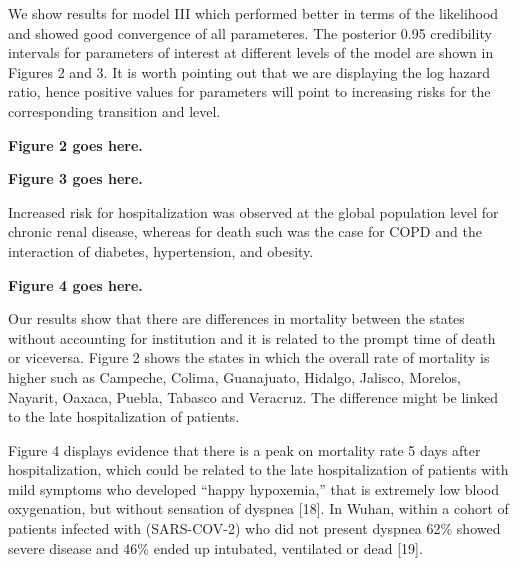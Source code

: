 \documentclass[10pt,letterpaper]{article}
\begin{document}
We show results for model III which performed better in terms of the
likelihood and showed good convergence of all parameteres. The posterior
0.95 credibility intervals for parameters of interest at different
levels of the model are shown in Figures 2 and 3. It is worth pointing
out that we are displaying the log hazard ratio, hence positive values
for parameters will point to increasing risks for the corresponding
transition and level.

\vspace{5mm}

\begin{center}
\textbf{Figure 2 goes here.}
\end{center}

\vspace{5mm}

\begin{center}
\textbf{Figure 3 goes here.}
\end{center}

\vspace{5mm}

Increased risk for hospitalization was observed at the global population
level for chronic renal disease, whereas for death such was the case for
COPD and the interaction of diabetes, hypertension, and obesity.

\vspace{5mm}

\begin{center}
\textbf{Figure 4 goes here.}
\end{center}

\vspace{5mm}

Our results show that there are differences in mortality between the
states without accounting for institution and it is related to the
prompt time of death or viceversa. Figure 2 shows the states in which
the overall rate of mortality is higher such as Campeche, Colima,
Guanajuato, Hidalgo, Jalisco, Morelos, Nayarit, Oaxaca, Puebla, Tabasco
and Veracruz. The difference might be linked to the late hospitalization
of patients.

Figure 4 displays evidence that there is a peak on mortality rate 5 days
after hospitalization, which could be related to the late
hospitalization of patients with mild symptoms who developed ``happy
hypoxemia,'' that is extremely low blood oxygenation, but without
sensation of dyspnea {[}18{]}. In Wuhan, within a cohort of patients
infected with (SARS-COV-2) who did not present dyspnea 62\% showed
severe disease and 46\% ended up intubated, ventilated or dead {[}19{]}.
\end{document}
